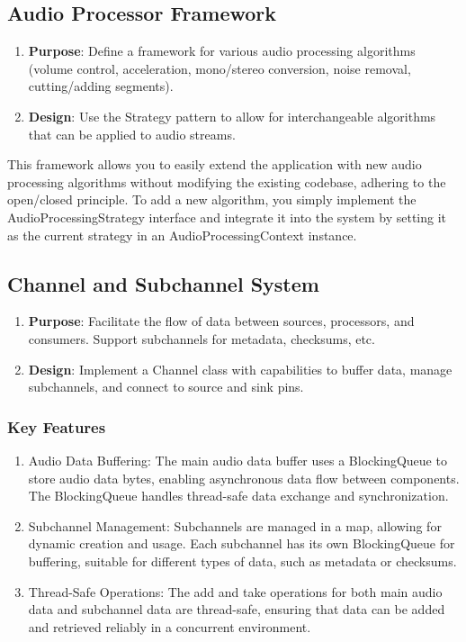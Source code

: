 \documentclass[a4paper,12pt]{article}
\begin{document}
\subsection{Audio Processor Framework}
\begin{enumerate}
  \item \textbf{Purpose}: Define a framework for various audio processing algorithms (volume control, acceleration, mono/stereo conversion, noise removal, cutting/adding segments).
  \item \textbf{Design}: Use the Strategy pattern to allow for interchangeable algorithms that can be applied to audio streams.
\end{enumerate}

This framework allows you to easily extend the application with new audio processing algorithms
without modifying the existing codebase, adhering to the open/closed principle.
To add a new algorithm, you simply implement the AudioProcessingStrategy interface and
integrate it into the system by setting it as the current strategy in an AudioProcessingContext instance.

\subsection{Channel and Subchannel System}
\begin{enumerate}
  \item \textbf{Purpose}: Facilitate the flow of data between sources, processors, and consumers. Support subchannels for metadata, checksums, etc.
  \item \textbf{Design}: Implement a Channel class with capabilities to buffer data, manage subchannels, and connect to source and sink pins.
\end{enumerate}

\subsubsection*{Key Features}
\begin{enumerate}
  \item Audio Data Buffering: The main audio data buffer uses a BlockingQueue to store audio data bytes, enabling asynchronous data flow between components. The BlockingQueue handles thread-safe data exchange and synchronization.
  \item Subchannel Management: Subchannels are managed in a map, allowing for dynamic creation and usage. Each subchannel has its own BlockingQueue for buffering, suitable for different types of data, such as metadata or checksums.
  \item Thread-Safe Operations: The add and take operations for both main audio data and subchannel data are thread-safe, ensuring that data can be added and retrieved reliably in a concurrent environment.
\end{enumerate}
\end{document}
